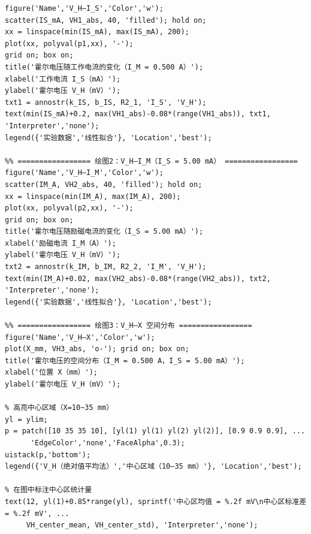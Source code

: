 ﻿\documentclass[12pt,a4paper]{article}
\begin{document}
\begin{lstlisting}[style=Matlab-boxed,caption={霍尔效应数据处理代码}]
%% ================= 绘图1：V_H–I_S（I_M = 0.500 A） =================
figure('Name','V_H–I_S','Color','w');
scatter(IS_mA, VH1_abs, 40, 'filled'); hold on;
xx = linspace(min(IS_mA), max(IS_mA), 200);
plot(xx, polyval(p1,xx), '-');
grid on; box on;
title('霍尔电压随工作电流的变化（I_M = 0.500 A）');
xlabel('工作电流 I_S（mA）');
ylabel('霍尔电压 V_H（mV）');
txt1 = annostr(k_IS, b_IS, R2_1, 'I_S', 'V_H');
text(min(IS_mA)+0.2, max(VH1_abs)-0.08*(range(VH1_abs)), txt1, 'Interpreter','none');
legend({'实验数据','线性拟合'}, 'Location','best');

%% ================= 绘图2：V_H–I_M（I_S = 5.00 mA） =================
figure('Name','V_H–I_M','Color','w');
scatter(IM_A, VH2_abs, 40, 'filled'); hold on;
xx = linspace(min(IM_A), max(IM_A), 200);
plot(xx, polyval(p2,xx), '-');
grid on; box on;
title('霍尔电压随励磁电流的变化（I_S = 5.00 mA）');
xlabel('励磁电流 I_M（A）');
ylabel('霍尔电压 V_H（mV）');
txt2 = annostr(k_IM, b_IM, R2_2, 'I_M', 'V_H');
text(min(IM_A)+0.02, max(VH2_abs)-0.08*(range(VH2_abs)), txt2, 'Interpreter','none');
legend({'实验数据','线性拟合'}, 'Location','best');

%% ================= 绘图3：V_H–X 空间分布 =================
figure('Name','V_H–X','Color','w');
plot(X_mm, VH3_abs, 'o-'); grid on; box on;
title('霍尔电压的空间分布（I_M = 0.500 A，I_S = 5.00 mA）');
xlabel('位置 X（mm）');
ylabel('霍尔电压 V_H（mV）');

% 高亮中心区域（X=10~35 mm）
yl = ylim;
p = patch([10 35 35 10], [yl(1) yl(1) yl(2) yl(2)], [0.9 0.9 0.9], ...
      'EdgeColor','none','FaceAlpha',0.3);
uistack(p,'bottom');
legend({'V_H（绝对值平均法）','中心区域（10–35 mm）'}, 'Location','best');

% 在图中标注中心区统计量
text(12, yl(1)+0.85*range(yl), sprintf('中心区均值 = %.2f mV\n中心区标准差 = %.2f mV', ...
     VH_center_mean, VH_center_std), 'Interpreter','none');
\end{lstlisting}
\end{document}
